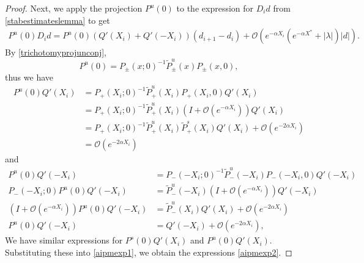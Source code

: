 \documentclass[thesis.tex]{subfiles}
\begin{document}
\begin{lemma}
\begin{proof}
Next, we apply the projection $P^u(0)$ to the expression for $D_i d$ from \cref{stabestimateslemma} to get
\begin{align*}
P^u(0) D_i d = 
P^u(0) ( Q'(X_i) + Q'(-X_i))(d_{i+1} - d_i ) + \mathcal{O}( e^{-\alpha X_i} (e^{-\alpha X^*} + |\lambda| )|d|) .
\end{align*}
By \cref{trichotomyprojunconj}, 
\begin{equation*}
P^u(0) = P_\pm(x; 0)^{-1} \tilde{P}^u_\pm(x) P_\pm(x, 0),
\end{equation*}
thus we have
\begin{align*}
P^u(0) Q'(X_i) &= P_+(X_i; 0)^{-1} \tilde{P}^u_+(X_i) P_+(X_i, 0) Q'(X_i) \\
&= P_+(X_i; 0)^{-1} \tilde{P}^u_+(X_i)( I + \mathcal{O}(e^{-\alpha X_i}))Q'(X_i) \\
&= P_+(X_i; 0)^{-1} \tilde{P}^u_+(X_i)\tilde{P}^s_+(X_i)Q'(X_i) + \mathcal{O}(e^{-2\alpha X_i}) \\
&= \mathcal{O}(e^{-2\alpha X_i})
\end{align*}
and 
\begin{align*}
P^u(0) Q'(-X_i) &= P_-(-X_i; 0)^{-1} \tilde{P}^u_-(-X_i) P_-(-X_i, 0) Q'(-X_i) \\
P_-(-X_i; 0) P^u(0) Q'(-X_i) &= \tilde{P}^u_-(-X_i)( I + \mathcal{O}(e^{-\alpha X_i}))Q'(-X_i) \\
( I + \mathcal{O}(e^{-\alpha X_i})) P^u(0) Q'(-X_i) &= \tilde{P}^u_-(X_i) Q'(X_i) + \mathcal{O}(e^{-2\alpha X_i}) \\
P^u(0) Q'(-X_i) &= Q'(-X_i) + \mathcal{O}(e^{-2\alpha X_i}),
\end{align*}
We have similar expressions for $P^s(0) Q'(X_i)$ and $P^u(0) Q'(X_i)$. Substituting these into \cref{aipmexp1}, we obtain the expressions \cref{aipmexp2}.
\end{proof}
\end{lemma}

\end{document}
